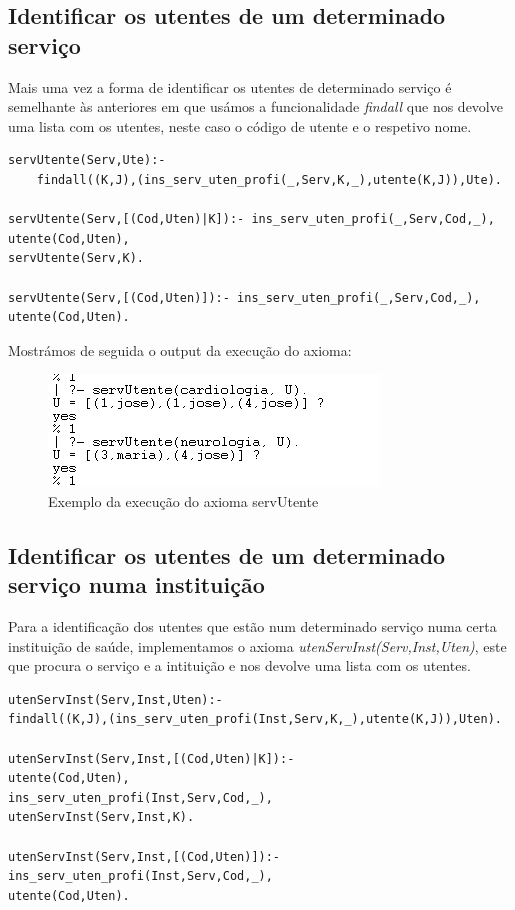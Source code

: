 \subsection{Identificar os utentes de um determinado serviço}
Mais uma vez a forma de identificar os utentes de determinado serviço é semelhante às anteriores em que usámos a funcionalidade \textit{findall} que nos devolve uma lista com os utentes, neste caso o código de utente e o respetivo nome. 

\begin{verbatim}
servUtente(Serv,Ute):-
	findall((K,J),(ins_serv_uten_profi(_,Serv,K,_),utente(K,J)),Ute).

servUtente(Serv,[(Cod,Uten)|K]):- ins_serv_uten_profi(_,Serv,Cod,_),
utente(Cod,Uten), 
servUtente(Serv,K).

servUtente(Serv,[(Cod,Uten)]):- ins_serv_uten_profi(_,Serv,Cod,_),
utente(Cod,Uten).
\end{verbatim}

Mostrámos de seguida o output da execução do axioma: 

\begin{figure}[<+htpb+>]
	\centering
	\includegraphics[scale=0.9]{answer3.png}
	\caption{Exemplo da execução do axioma servUtente}
	\label{p3:fig:output3}
\end{figure}

\subsection{Identificar os utentes de um determinado serviço numa instituição}
Para a identificação dos utentes que estão num determinado serviço numa certa instituição de saúde, implementamos o axioma \textit{utenServInst(Serv,Inst,Uten)}, este que procura o serviço e a intituição e nos devolve uma lista com os utentes. 
\begin{verbatim}
utenServInst(Serv,Inst,Uten):- 
findall((K,J),(ins_serv_uten_profi(Inst,Serv,K,_),utente(K,J)),Uten). 

utenServInst(Serv,Inst,[(Cod,Uten)|K]):-
utente(Cod,Uten),
ins_serv_uten_profi(Inst,Serv,Cod,_),
utenServInst(Serv,Inst,K).

utenServInst(Serv,Inst,[(Cod,Uten)]):-
ins_serv_uten_profi(Inst,Serv,Cod,_),
utente(Cod,Uten).
\end{verbatim}

